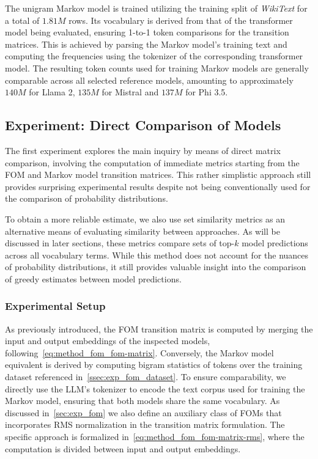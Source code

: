 The unigram Markov model is trained utilizing the training split of \emph{WikiText} for a total of $1.81M$ rows.
Its vocabulary is derived from that of the transformer model being evaluated, ensuring 1-to-1 token comparisons for the transition matrices.
This is achieved by parsing the Markov model's training text and computing the frequencies using the tokenizer of the corresponding transformer model.
The resulting token counts used for training Markov models are generally comparable across all selected reference models, amounting to approximately $140M$ for Llama 2, $135M$ for Mistral and $137M$ for Phi 3.5.

\subsection{Experiment: Direct Comparison of Models}\label{ssec:exp_fom_exp1}

The first experiment explores the main inquiry by means of direct matrix comparison, involving the computation of immediate metrics starting from the FOM and Markov model transition matrices.
This rather simplistic approach still provides surprising experimental results despite not being conventionally used for the comparison of probability distributions.

To obtain a more reliable estimate, we also use set similarity metrics as an alternative means of evaluating similarity between approaches.
As will be discussed in later sections, these metrics compare sets of top-$k$ model predictions across all vocabulary terms.
While this method does not account for the nuances of probability distributions, it still provides valuable insight into the comparison of greedy estimates between model predictions.

\subsubsection{Experimental Setup}\label{sssec:exp_fom_exp1_expset}

As previously introduced, the FOM transition matrix is computed by merging the input and output embeddings of the inspected models, following~\cref{eq:method_fom_fom-matrix}.
Conversely, the Markov model equivalent is derived by computing bigram statistics of tokens over the training dataset referenced in~\cref{ssec:exp_fom_dataset}.
To ensure comparability, we directly use the LLM's tokenizer to encode the text corpus used for training the Markov model, ensuring that both models share the same vocabulary.
As discussed in~\cref{sec:exp_fom} we also define an auxiliary class of FOMs that incorporates RMS normalization in the transition matrix formulation.
The specific approach is formalized in~\cref{eq:method_fom_fom-matrix-rms}, where the computation is divided between input and output embeddings.

